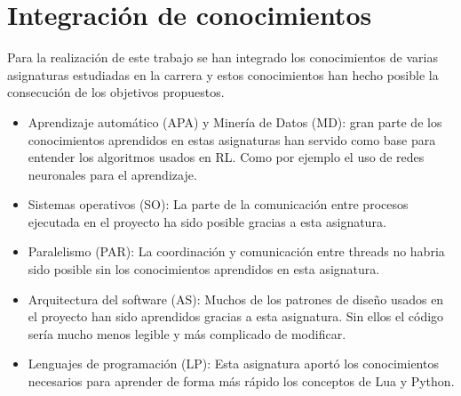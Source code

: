 \section{Integración de conocimientos}

Para la realización de este trabajo se han integrado los conocimientos de varias asignaturas estudiadas en la carrera y estos conocimientos han hecho posible la consecución de los objetivos propuestos.

\begin{itemize}
    \item Aprendizaje automático (APA) y Minería de Datos (MD): gran parte de los conocimientos aprendidos en estas asignaturas han servido como base para entender los algoritmos usados en RL. Como por ejemplo el uso de redes neuronales para el aprendizaje.
    \item Sistemas operativos (SO): La parte de la comunicación entre procesos ejecutada en el proyecto ha sido posible gracias a esta asignatura.
    \item Paralelismo (PAR): La coordinación y comunicación entre threads no habria sido posible sin los conocimientos aprendidos en esta asignatura.
    \item Arquitectura del software (AS): Muchos de los patrones de diseño usados en el proyecto han sido aprendidos gracias a esta asignatura. Sin ellos el código sería mucho menos legible y más complicado de modificar.
    \item Lenguajes de programación (LP): Esta asignatura aportó los conocimientos necesarios para aprender de forma más rápido los conceptos de Lua y Python.
\end{itemize}

